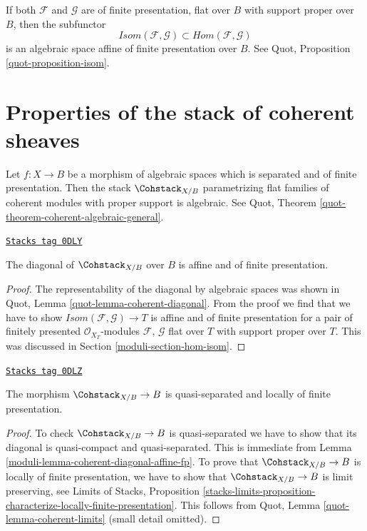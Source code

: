 \medskip\noindent
If both $\mathcal{F}$ and $\mathcal{G}$ are of finite presentation,
flat over $B$ with support proper over $B$, then the subfunctor
$$
\mathit{Isom}(\mathcal{F}, \mathcal{G}) \subset
\mathit{Hom}(\mathcal{F}, \mathcal{G})
$$
is an algebraic space affine of finite presentation over $B$.
See Quot, Proposition \ref{quot-proposition-isom}.

\section{Properties of the stack of coherent sheaves}
\label{moduli-section-stack-coherent-sheaves}
Let $f : X \to B$ be a morphism of algebraic spaces which is
separated and of finite presentation. Then the stack
$\Cohstack_{X/B}$ parametrizing flat families of coherent
modules with proper support is algebraic. See
Quot, Theorem \ref{quot-theorem-coherent-algebraic-general}.

\begin{lemma}
\label{moduli-lemma-coherent-diagonal-affine-fp}
\href{https://stacks.math.columbia.edu/tag/0DLY}{\texttt{Stacks tag 0DLY}}

The diagonal of $\Cohstack_{X/B}$ over $B$ is affine
and of finite presentation.
\end{lemma}

\begin{proof}
The representability of the diagonal by algebraic spaces
was shown in Quot, Lemma \ref{quot-lemma-coherent-diagonal}.
From the proof we find that we have to show
$\mathit{Isom}(\mathcal{F}, \mathcal{G}) \to T$
is affine and of finite presentation for a pair of
finitely presented $\mathcal{O}_{X_T}$-modules
$\mathcal{F}$, $\mathcal{G}$ flat over $T$ with support
proper over $T$. This was discussed in Section \ref{moduli-section-hom-isom}.
\end{proof}

\begin{lemma}
\label{moduli-lemma-coherent-qs-lfp}
\href{https://stacks.math.columbia.edu/tag/0DLZ}{\texttt{Stacks tag 0DLZ}}

The morphism $\Cohstack_{X/B} \to B$ is quasi-separated and
locally of finite presentation.
\end{lemma}

\begin{proof}

To check $\Cohstack_{X/B} \to B$ is quasi-separated we have to
show that its diagonal is quasi-compact and quasi-separated.
This is immediate from Lemma \ref{moduli-lemma-coherent-diagonal-affine-fp}.
To prove that $\Cohstack_{X/B} \to B$ is locally of finite
presentation, we have to show that $\Cohstack_{X/B} \to B$
is limit preserving, see
Limits of Stacks, Proposition
\ref{stacks-limits-proposition-characterize-locally-finite-presentation}.
This follows from Quot, Lemma \ref{quot-lemma-coherent-limits}
(small detail omitted).
\end{proof}

